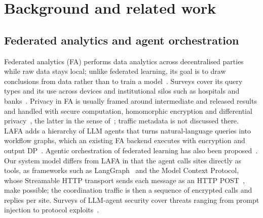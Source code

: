 \section{Background and related work}\label{sec:related}

\subsection{Federated analytics and agent orchestration}
Federated analytics (FA) performs data analytics across decentralised parties while raw data stays local; unlike federated learning, its goal is to draw conclusions from data rather than to train a model~\cite{wang2022federated}. Surveys cover its query types and its use across devices and institutional silos such as hospitals and banks~\cite{elkordy2023federated,wang2024survey}. Privacy in FA is usually framed around intermediate and released results and handled with secure computation, homomorphic encryption and differential privacy~\cite{wang2022federated}, the latter in the sense of~\cite{dwork2014algorithmic}; traffic metadata is not discussed there. LAFA adds a hierarchy of LLM agents that turns natural-language queries into workflow graphs, which an existing FA backend executes with encryption and output DP~\cite{ji2025lafa}. Agentic orchestration of federated learning has also been proposed~\cite{jarczewski2026agentic}. Our system model differs from LAFA in that the agent calls sites directly as tools, as frameworks such as LangGraph~\cite{langgraph2026docs} and the Model Context Protocol, whose Streamable HTTP transport sends each message as an HTTP POST~\cite{mcp2026spec}, make possible; the coordination traffic is then a sequence of encrypted calls and replies per site. Surveys of LLM-agent security cover threats ranging from prompt injection to protocol exploits~\cite{deng2025agents,ferrag2026prompt}.

